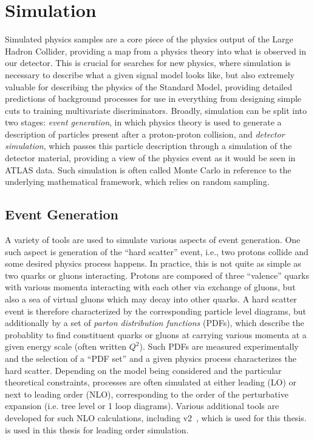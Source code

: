 \chapter{Simulation}
\label{chap:simulation}

Simulated physics samples are a core piece of the physics output of the Large Hadron Collider, 
providing a map from a physics theory into what is observed in our detector. This is crucial for 
searches for new physics, where simulation is necessary to describe what a given signal model looks 
like, but also extremely valuable for describing the physics of the Standard Model, providing detailed 
predictions of background processes for use in everything from designing simple cuts to training 
multivariate discriminators. Broadly, simulation can be split into two stages: \emph{event generation}, in which 
physics theory is used to generate a description of particles present after a proton-proton collision, and 
\emph{detector simulation}, which passes this particle description through a simulation of the detector 
material, providing a view of the physics event as it would be seen in ATLAS data. Such simulation 
is often called Monte Carlo in reference to the underlying mathematical framework, which relies on random 
sampling. 

\section{Event Generation}
A variety of tools are used to simulate various aspects of event generation. 
One such aspect is generation of the ``hard scatter'' event, i.e., two protons collide and 
some desired physics process happens. In practice, this is not quite as simple as two quarks or 
gluons interacting. Protons are composed of three ``valence'' quarks with various momenta interacting 
with each other via exchange of gluons, but also a sea of virtual gluons which may decay into other
quarks. A hard scatter event is therefore characterized by the corresponding particle level 
diagrams, but additionally by a set of \emph{parton distribution functions} (PDFs), which describe the 
probablity to find constituent quarks or gluons at carrying various momenta at a given energy 
scale (often written $Q^2$). Such PDFs are measured experimentally  and the selection 
of a ``PDF set'' and a given physics process characterizes the hard scatter. Depending on the model being 
considered and the particular theoretical constraints, processes are often simulated at either leading (LO) 
or next to leading order (NLO), corresponding to the order of the perturbative expansion (i.e. tree level 
or 1 loop diagrams). Various additional tools are developed for such NLO calculations, 
including \POWHEGBOX v2~\cite{Powheg1, Powheg2, Powheg3}, which is used for this thesis. \MADGRAPH\cite{MG5} is 
used in this thesis for leading order simulation.

